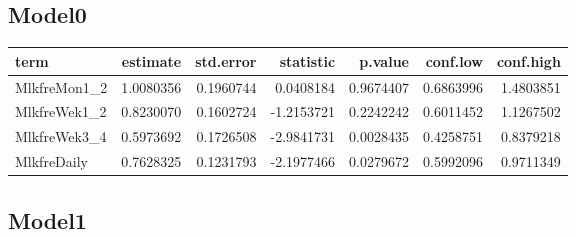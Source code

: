 \documentclass[]{article}
\newenvironment{Shaded}{\begin{snugshade}}{\end{snugshade}}
\newcommand{\DataTypeTok}[1]{\textcolor[rgb]{0.13,0.29,0.53}{#1}}
\newcommand{\KeywordTok}[1]{\textcolor[rgb]{0.13,0.29,0.53}{\textbf{#1}}}
\newcommand{\NormalTok}[1]{#1}
\newcommand{\OperatorTok}[1]{\textcolor[rgb]{0.81,0.36,0.00}{\textbf{#1}}}
\newcommand{\OtherTok}[1]{\textcolor[rgb]{0.56,0.35,0.01}{#1}}
\newcommand{\StringTok}[1]{\textcolor[rgb]{0.31,0.60,0.02}{#1}}
\begin{document}
\hypertarget{model0-5}{%
\subsection{Model0}\label{model0-5}}

\begin{Shaded}
\end{Shaded}

\begin{longtable}[]{@{}lrrrrrr@{}}
\toprule
term & estimate & std.error & statistic & p.value & conf.low &
conf.high\tabularnewline
\midrule
\endhead
MlkfreMon1\_2 & 1.0080356 & 0.1960744 & 0.0408184 & 0.9674407 &
0.6863996 & 1.4803851\tabularnewline
MlkfreWek1\_2 & 0.8230070 & 0.1602724 & -1.2153721 & 0.2242242 &
0.6011452 & 1.1267502\tabularnewline
MlkfreWek3\_4 & 0.5973692 & 0.1726508 & -2.9841731 & 0.0028435 &
0.4258751 & 0.8379218\tabularnewline
MlkfreDaily & 0.7628325 & 0.1231793 & -2.1977466 & 0.0279672 & 0.5992096
& 0.9711349\tabularnewline
\bottomrule
\end{longtable}

\hypertarget{model1-5}{%
\subsection{Model1}\label{model1-5}}

\begin{Shaded}
\end{Shaded}
\end{document}
